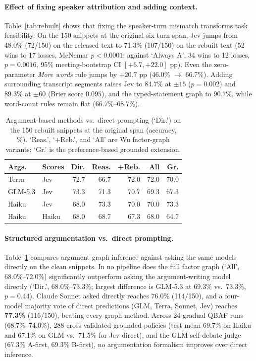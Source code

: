 \documentclass[11pt]{article}
\begin{document}
\paragraph{Effect of fixing speaker attribution and adding context.}
Table~\ref{tab:rebuilt} shows that fixing the speaker-turn mismatch transforms task feasibility.
On the 150 snippets at the original six-turn span, Jev jumps from 48.0\% (72/150) on the released text to 71.3\% (107/150) on the rebuilt text (52 wins to 17 losses, McNemar $p<0.0001$; against `Always A', 34 wins to 12 losses, $p=0.0016$, 95\% meeting-bootstrap CI $[+6.7, +22.0]$ pp).
Even the zero-parameter \emph{More words} rule jumps by $+20.7$ pp (46.0\% $\to$ 66.7\%).
Adding surrounding transcript segments raises Jev to 84.7\% at $\pm 15$ ($p=0.002$) and 89.3\% at $\pm 60$ (Brier score $0.095$), and the typed-statement graph to 90.7\%, while word-count rules remain flat (66.7\%--68.7\%).

\begin{table}[t]
\centering\small
\setlength{\tabcolsep}{3pt}
\begin{tabular}{llrrrrr}
\toprule
Args. & Scores & Dir. & Reas. & +Reb. & All & Gr. \\
\midrule
Terra & Jev & 72.7 & 66.7 & 72.0 & 72.0 & 70.0 \\
GLM-5.3 & Jev & 73.3 & 71.3 & 70.7 & 69.3 & 67.3 \\
Haiku & Jev & 68.0 & 73.3 & 70.0 & 70.0 & 73.3 \\
Haiku & Haiku & 68.0 & 68.7 & 67.3 & 68.0 & 64.7 \\
\bottomrule
\end{tabular}
\caption{Argument-based methods vs.\ direct prompting (`Dir.') on the 150 rebuilt snippets at the original span (accuracy, \%). `Reas.', `+Reb.', and `All' are Wu factor-graph variants; `Gr.' is the preference-based grounded extension.}
\label{tab:graph}
\end{table}

\paragraph{Structured argumentation vs.\ direct prompting.}
Table~\ref{tab:graph} compares argument-graph inference against asking the same models directly on the clean snippets.
In no pipeline does the full factor graph (`All', 68.0\%--72.0\%) significantly outperform asking the argument-writing model directly (`Dir.', 68.0\%--73.3\%; largest difference is GLM-5.3 at 69.3\% vs.\ 73.3\%, $p=0.44$).
Claude Sonnet asked directly reaches 76.0\% (114/150), and a four-model majority vote of direct predictions (GLM, Terra, Sonnet, Jev) reaches \textbf{77.3\%} (116/150), beating every graph method.
Across 24 gradual QBAF runs (68.7\%--74.0\%), 288 cross-validated grounded policies (test mean 69.7\% on Haiku and 67.1\% on GLM vs.\ 71.5\% for Jev direct), and the GLM self-debate judge (67.3\% A-first, 69.3\% B-first), no argumentation formalism improves over direct inference.
\end{document}
